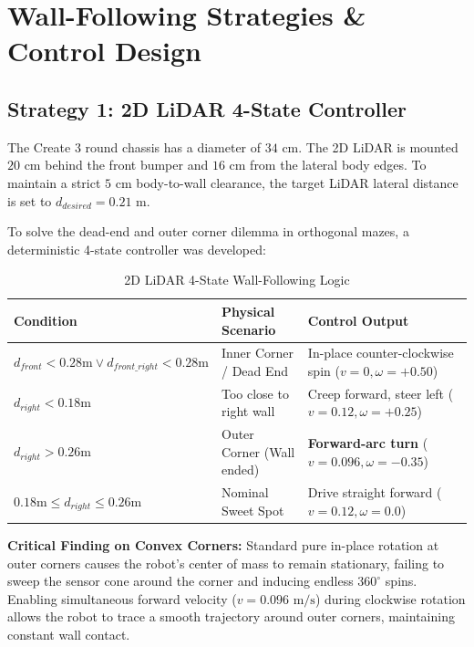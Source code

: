 \documentclass[11pt,a4paper]{article}
\begin{document}
\section{Wall-Following Strategies \& Control Design}

\subsection{Strategy 1: 2D LiDAR 4-State Controller}
The Create 3 round chassis has a diameter of $34\text{ cm}$. The 2D LiDAR is mounted $20\text{ cm}$ behind the front bumper and $16\text{ cm}$ from the lateral body edges. To maintain a strict $5\text{ cm}$ body-to-wall clearance, the target LiDAR lateral distance is set to $d_{desired} = 0.21\text{ m}$.

To solve the dead-end and outer corner dilemma in orthogonal mazes, a deterministic 4-state controller was developed:

\begin{table}[h!]
\centering
\caption{2D LiDAR 4-State Wall-Following Logic}
\label{tab:lidar_states}
\begin{tabular}{lll}
\toprule
\textbf{Condition} & \textbf{Physical Scenario} & \textbf{Control Output} \\
\midrule
$d_{front} < 0.28\text{m} \lor d_{front\_right} < 0.28\text{m}$ & Inner Corner / Dead End & In-place counter-clockwise spin ($v=0, \omega=+0.50$) \\
$d_{right} < 0.18\text{m}$ & Too close to right wall & Creep forward, steer left ($v=0.12, \omega=+0.25$) \\
$d_{right} > 0.26\text{m}$ & Outer Corner (Wall ended) & \textbf{Forward-arc turn} ($v=0.096, \omega=-0.35$) \\
$0.18\text{m} \le d_{right} \le 0.26\text{m}$ & Nominal Sweet Spot & Drive straight forward ($v=0.12, \omega=0.0$) \\
\bottomrule
\end{tabular}
\end{table}

\noindent\textbf{Critical Finding on Convex Corners:} Standard pure in-place rotation at outer corners causes the robot's center of mass to remain stationary, failing to sweep the sensor cone around the corner and inducing endless $360^\circ$ spins. Enabling simultaneous forward velocity ($v = 0.096\text{ m/s}$) during clockwise rotation allows the robot to trace a smooth trajectory around outer corners, maintaining constant wall contact.
\end{document}
